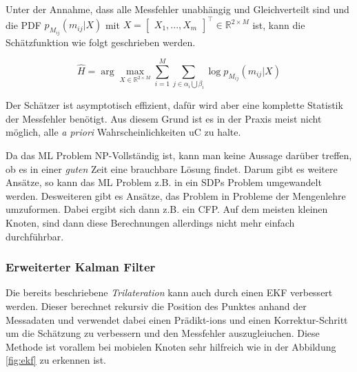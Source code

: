 Unter der Annahme, dass alle Messfehler unabhängig und Gleichverteilt
sind und die \ac{PDF} $p_{M_{ij}}(m_{ij} \vert X)$ mit $X
= \begin{bmatrix}X_{1}, ..., X_{m}\end{bmatrix}^{\top} \in
\mathbb{R}^{2 \times M}$ ist, kann die Schätzfunktion wie folgt
geschrieben werden.

\begin{framed}
  \begin{equation}
    \label{eq:maxlike}
    \hat H = \arg \max_{X \in \mathbb{R}^{2 \times M}} \sum_{i=1}^{M}
    \sum_{j \in \alpha_{i} \bigcup \beta_{i}} \log p_{M_{ij}}(m_{ij}
    \vert X)
  \end{equation}
\end{framed}

Der Schätzer ist asymptotisch effizient, dafür wird aber eine
komplette Statistik der Messfehler benötigt. Aus diesem Grund ist es
in der Praxis meist nicht möglich, alle \textit{a priori}
Wahrscheinlichkeiten \ac{uC} zu halte.

Da das \ac{ML} Problem NP-Vollständig ist, kann man keine Aussage
darüber treffen, ob es in einer \textit{guten} Zeit eine brauchbare
Lösung findet. Darum gibt es weitere Ansätze, so kann das \ac{ML}
Problem z.B. in ein \ac{SDP}s Problem umgewandelt werden. Desweiteren
gibt es Ansätze, das Problem in Probleme der Mengenlehre umzuformen.
Dabei ergibt sich dann z.B. ein \ac{CFP}. Auf dem meisten kleinen
Knoten, sind dann diese Berechnungen allerdings nicht mehr einfach
durchführbar. \cite{gholami2011}


\subsubsection{Erweiterter Kalman Filter}

Die bereits beschriebene \textit{Trilateration} kann auch durch einen
\ac{EKF} verbessert werden. Dieser berechnet rekursiv die Position des
Punktes anhand der Messadaten und verwendet dabei einen Prädikt-ions
und einen Korrektur-Schritt um die Schätzung zu verbessern und den
Messfehler auszugleiuchen. Diese Methode ist vorallem bei mobielen
Knoten sehr hilfreich wie in der Abbildung \ref{fig:ekf} zu erkennen
ist.


